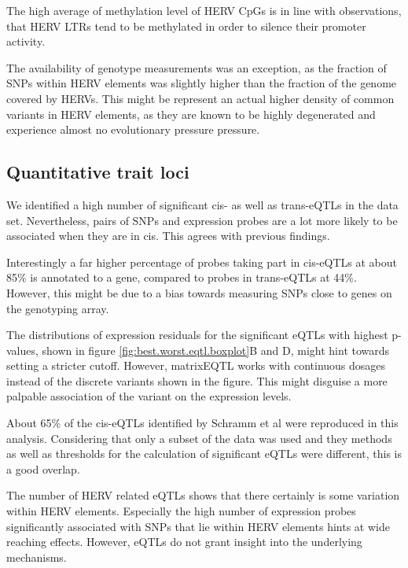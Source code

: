 \documentclass[a4paper,12pt,twoside,openright]{article}
\begin{document}
The high average of methylation level of HERV CpGs is in line with observations, that HERV LTRs tend to be methylated in order to silence their promoter activity\cite{Smith2013}.

The availability of genotype measurements was an exception, as the fraction of SNPs within HERV elements was slightly higher than the fraction of the genome covered by HERVs. This might be represent an actual higher density of common variants in HERV elements, as they are known to be highly degenerated and experience almost no evolutionary pressure pressure\cite{10.1146/annurev.genom.7.080505.115700}.

\subsection{Quantitative trait loci}
\label{Discussion:Quantitative trait loci}
We identified a high number of significant cis- as well as trans-eQTLs in the data set. Nevertheless, pairs of SNPs and expression probes are a lot more likely to be associated when they are in cis. This agrees with previous findings\cite{Joehanes2017}.

Interestingly a far higher percentage of probes taking part in cis-eQTLs at about 85\% is annotated to a gene, compared to probes in trans-eQTLs at 44\%. However, this might be due to a bias towards measuring SNPs close to genes on the genotyping array.
 
The distributions of expression residuals for the significant eQTLs with highest p-values, shown in figure \ref{fig:best.worst.eqtl.boxplot}B and D, might hint towards setting a stricter cutoff. However, matrixEQTL works with continuous dosages instead of the discrete variants shown in the figure. This might disguise a more palpable association of the variant on the expression levels.

About 65\% of the cis-eQTLs identified by Schramm et al\cite{Schramm2014} were reproduced in this analysis. Considering that only a subset of the data was used and they methods as well as thresholds for the calculation of significant eQTLs were different, this is a good overlap. 

The number of HERV related eQTLs shows that there certainly is some variation within HERV elements. Especially the high number of expression probes significantly associated with SNPs that lie within HERV elements hints at wide reaching effects. However, eQTLs do not grant insight into the underlying mechanisms. 
\end{document}

